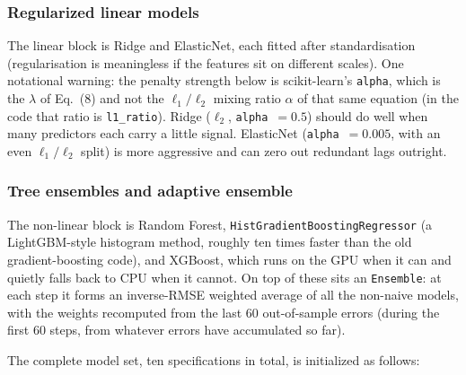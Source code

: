 \subsubsection{Regularized linear models}

The linear block is Ridge and ElasticNet, each fitted after standardisation (regularisation is meaningless if the features sit on different scales). One notational warning: the penalty strength below is scikit-learn's \texttt{alpha}, which is the $\lambda$ of Eq.~(8) and not the $\ell_1/\ell_2$ mixing ratio $\alpha$ of that same equation (in the code that ratio is \texttt{l1\_ratio}). Ridge ($\ell_2$, \texttt{alpha}~$= 0.5$) should do well when many predictors each carry a little signal. ElasticNet (\texttt{alpha}~$= 0.005$, with an even $\ell_1/\ell_2$ split) is more aggressive and can zero out redundant lags outright.

\subsubsection{Tree ensembles and adaptive ensemble}

The non-linear block is Random Forest, \texttt{HistGradientBoostingRegressor} (a LightGBM-style histogram method, roughly ten times faster than the old gradient-boosting code), and XGBoost, which runs on the GPU when it can and quietly falls back to CPU when it cannot. On top of these sits an \texttt{Ensemble}: at each step it forms an inverse-RMSE weighted average of all the non-naive models, with the weights recomputed from the last 60 out-of-sample errors (during the first 60 steps, from whatever errors have accumulated so far).

The complete model set, ten specifications in total, is initialized as follows:

